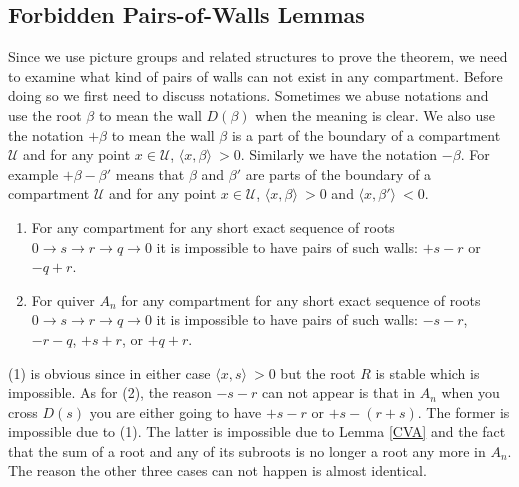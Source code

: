 \subsection{Forbidden Pairs-of-Walls Lemmas}
\indent Since we use picture groups and related structures to prove the theorem, we need to examine what kind of pairs of walls can not exist in any compartment. Before doing so we first need to discuss notations. Sometimes we abuse notations and use the root $\beta$ to mean the wall $D(\beta)$ when the meaning is clear. We also use the notation $+\beta$ to mean the wall $\beta$ is a part of the boundary of a compartment $\mathcal{U}$ and for any point $x\in\mathcal{U}$, $\langle x,\beta\rangle\ >0$. Similarly we have the notation $-\beta$. For example $+\beta-\beta'$ means that $\beta$ and $\beta'$ are parts of the boundary of a compartment $\mathcal{U}$ and for any point $x\in\mathcal{U}$, $\langle x,\beta\rangle\ >0$ and $\langle x,\beta'\rangle\ <0$.\\
\begin{lemma}\label{C1L}
\begin{enumerate}
\item For any compartment for any short exact sequence of roots $0\rightarrow s\rightarrow r\rightarrow q\rightarrow 0$ it is impossible to have pairs of such walls: $+s-r$ or $-q+r$.\\
\item For quiver $A_n$ for any compartment for any short exact sequence of roots $0\rightarrow s\rightarrow r\rightarrow q\rightarrow 0$ it is impossible to have pairs of such walls: $-s-r$, $-r-q$, $+s+r$, or $+q+r$.
\end{enumerate}
\end{lemma}
\indent (1) is obvious since in either case $\langle x,s\rangle\ >0$ but the root $R$ is stable which is impossible. As for (2), the reason $-s-r$ can not appear is that in $A_n$ when you cross $D(s)$ you are either going to have $+s-r$ or $+s-(r+s)$. The former is impossible due to (1). The latter is impossible due to Lemma \ref{CVA} and the fact that the sum of a root and any of its subroots is no longer a root any more in $A_n$. The reason the other three cases can not happen is almost identical.\\
